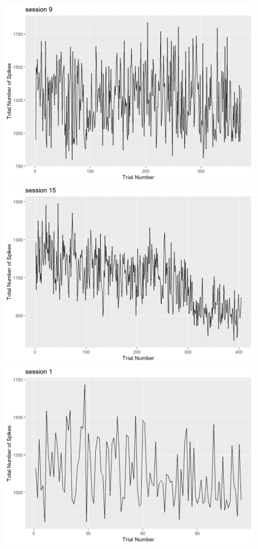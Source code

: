 \documentclass[
]{article}
\begin{document}
\includegraphics{images/unnamed-chunk-6-1.png}
\includegraphics{images/unnamed-chunk-6-2.png}
\includegraphics{images/unnamed-chunk-6-3.png}
\end{document}
